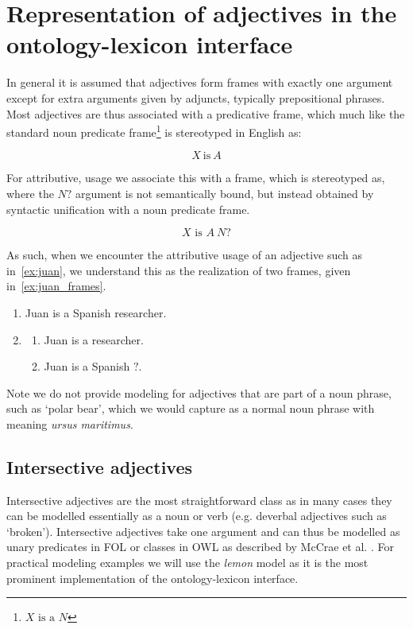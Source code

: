 \documentclass[11pt]{article}
\begin{document}
\section{Representation of adjectives in the ontology-lexicon interface}

In general it is assumed that adjectives form frames with exactly one argument 
except for extra arguments given by adjuncts, typically prepositional phrases. 
Most adjectives are thus associated with a predicative frame, which much
like the standard noun predicate frame\footnote{$X\text{ is a }N$} is stereotyped in English as:

$$X\mathrm{~is~}A$$

For attributive, usage we associate this with a frame, which is stereotyped as,
where the $N?$ argument is not semantically bound, but instead obtained by
syntactic unification with a noun predicate frame.

$$X\text{ is }A~N?$$

As such, when we encounter the attributive usage of an adjective such as in~\ref{ex:juan}, 
we understand this as the realization of two frames, given in~\ref{ex:juan_frames}.

\begin{enumerate}[resume]
\item Juan is a Spanish researcher. \label{ex:juan}
\item \begin{enumerate}
\item Juan is a researcher.
\item Juan is a Spanish $?$.
\end{enumerate}
\label{ex:juan_frames}
\end{enumerate}

Note we do not provide modeling for adjectives that are part of a noun phrase,
such as `polar bear', which we would capture as a normal noun phrase with 
meaning \emph{ursus maritimus}.

\subsection{Intersective adjectives}

Intersective adjectives are the most straightforward class as in many cases they 
can be modelled essentially as a noun or verb (e.g. deverbal adjectives such as `broken'). Intersective 
adjectives take one argument and can thus be modelled as unary predicates in FOL or classes in OWL as described by McCrae et al. \cite{mccrae2014design}. For practical modeling examples we will use the
\emph{lemon} model as it is the most prominent implementation of the 
ontology-lexicon interface.
\end{document}
